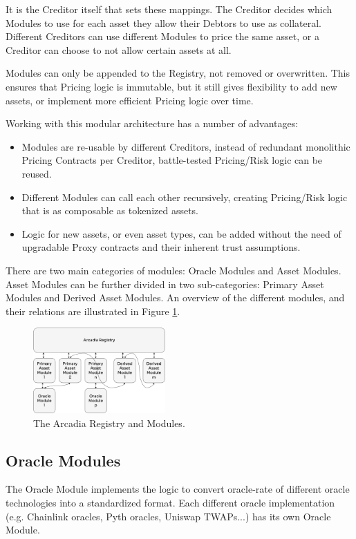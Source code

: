\documentclass[sigconf,nonacm]{acmart}
\begin{document}
It is the Creditor itself that sets these mappings. The Creditor decides which Modules to use for each asset they allow their Debtors to use as collateral.
Different Creditors can use different Modules to price the same asset, or a Creditor can choose to not allow certain assets at all.

Modules can only be appended to the Registry, not removed or overwritten.
This ensures that Pricing logic is immutable, but it still gives flexibility to add new assets, or implement more efficient Pricing logic over time.

Working with this modular architecture has a number of advantages:
\begin{itemize}
    \item Modules are re-usable by different Creditors, instead of redundant monolithic Pricing Contracts per Creditor, battle-tested Pricing/Risk logic can be reused.
    \item Different Modules can call each other recursively, creating Pricing/Risk logic that is as composable as tokenized assets.
    \item Logic for new assets, or even asset types, can be added without the need of upgradable Proxy contracts and their inherent trust assumptions.
\end{itemize}

There are two main categories of modules: Oracle Modules and Asset Modules.
Asset Modules can be further divided in two sub-categories: Primary Asset Modules and Derived Asset Modules.
An overview of the different modules, and their relations are illustrated in Figure \ref{fig:arcadia-registry}.

\begin{figure}
    \centering
    \includegraphics[width=0.45\textwidth]{images/Arcadia-Registry.png}
    \caption{The Arcadia Registry and Modules. \label{fig:arcadia-registry}}
\end{figure}

\subsection{Oracle Modules}
The Oracle Module implements the logic to convert oracle-rate of different oracle technologies into a standardized format.
Each different oracle implementation (e.g. Chainlink oracles, Pyth oracles, Uniswap TWAPs...) has its own Oracle Module.
\end{document}
